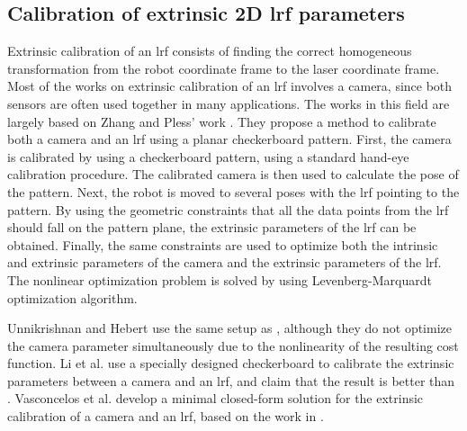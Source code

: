 \subsection{Calibration of extrinsic 2D \ac{lrf} parameters}
\label{sec:laser_calib}
Extrinsic calibration of an \ac{lrf} consists of finding the correct homogeneous transformation from the robot coordinate frame to the laser coordinate frame. Most of the works on extrinsic calibration of an \ac{lrf} involves a camera, since both sensors are often used together in many applications. The works in this field are largely based on Zhang and Pless' work \cite{Zhang2004}. They propose a method to calibrate both a camera and an \ac{lrf} using a planar checkerboard pattern. First, the camera is calibrated by using a checkerboard pattern, using a standard hand-eye calibration procedure. The calibrated camera is then used to calculate the pose of the pattern. Next, the robot is moved to several poses with the \ac{lrf} pointing to the pattern. By using the geometric constraints that all the data points from the \ac{lrf} should fall on the pattern plane, the extrinsic parameters of the \ac{lrf} can be obtained. Finally, the same constraints are used to optimize both the intrinsic and extrinsic parameters of the camera and the extrinsic parameters of the \ac{lrf}. The nonlinear optimization problem is solved by using Levenberg-Marquardt optimization algorithm.

Unnikrishnan and Hebert \cite{Unnikrishnan2005} use the same setup as \cite{Zhang2004}, although they do not optimize the camera parameter simultaneously due to the nonlinearity of the resulting cost function. 
Li et al. \cite{Li2007} use a specially designed checkerboard to calibrate the extrinsic parameters between a camera and an \ac{lrf}, and claim that the result is better than \cite{Zhang2004}. Vasconcelos et al. \cite{Vasconcelos2012} develop a minimal closed-form solution for the extrinsic calibration of a camera and an \ac{lrf}, based on the work in \cite{Zhang2004}. 


